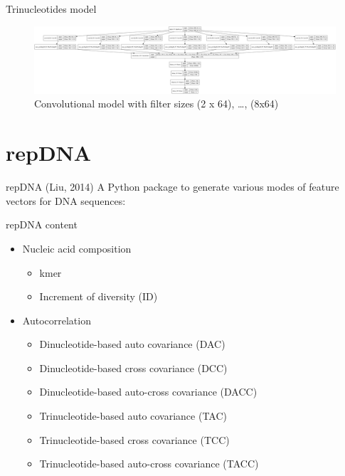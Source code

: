 \documentclass[10pt]{beamer}
\begin{document}
\begin{frame}{Trinucleotides model}
	\begin{figure}[ht]
		\centering
		\includegraphics[width = 1.05\textwidth]{../../models/plotted_models/trint_model_2019-10-02_14-53-06.png}
		\caption{Convolutional model with filter sizes (2 x 64), \dots, (8x64)}
	\end{figure}
\end{frame}

\section{repDNA}
\begin{frame}{repDNA (Liu, 2014)}
	A \glqq Python package to generate various modes of feature vectors for DNA sequences\grqq:
	\begin{block}{repDNA content}
		\begin{itemize}
			\item Nucleic acid composition
			\begin{itemize}
				\item kmer
				\item Increment of diversity (ID)
			\end{itemize}
			\item Autocorrelation
			\begin{itemize}
				\item Dinucleotide-based auto covariance (DAC)
				\item Dinucleotide-based cross covariance (DCC)
				\item Dinucleotide-based auto-cross covariance (DACC)
				\item Trinucleotide-based auto covariance (TAC)
				\item Trinucleotide-based cross covariance (TCC)
				\item Trinucleotide-based auto-cross covariance (TACC)
			\end{itemize}
		\end{itemize}
	\end{block}
\end{frame}
\end{document}
